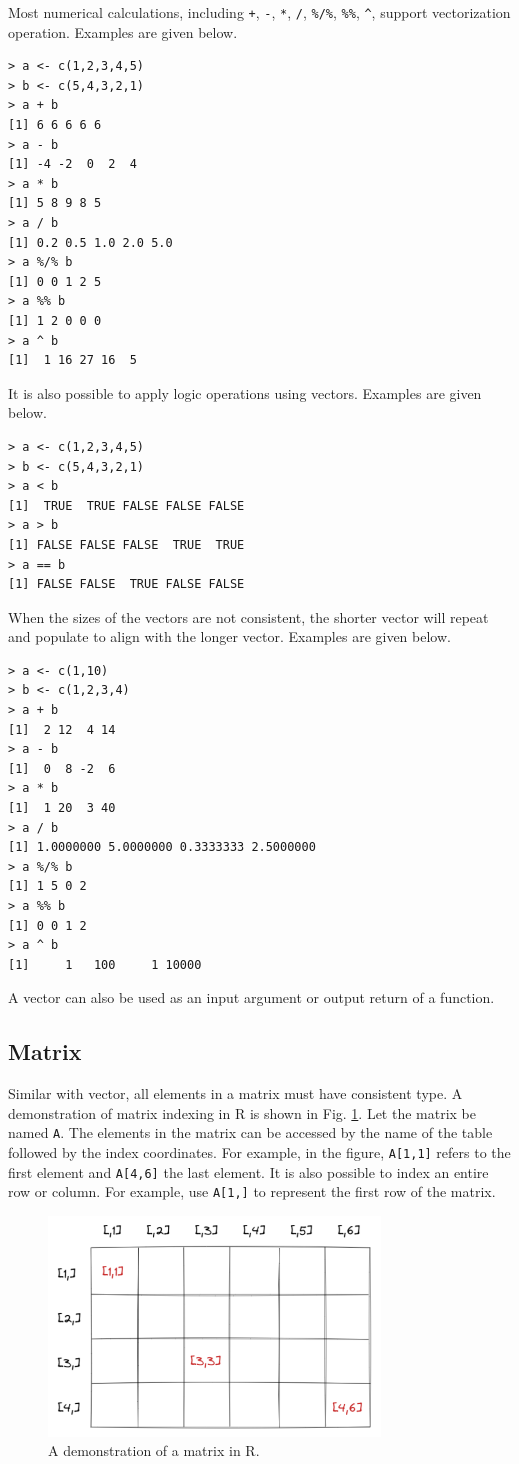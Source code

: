 Most numerical calculations, including \verb|+|, \verb|-|, \verb|*|, \verb|/|, \verb|%/%|, \verb|%%|, \verb|^|, support vectorization operation. Examples are given below.
\begin{lstlisting}
> a <- c(1,2,3,4,5)
> b <- c(5,4,3,2,1)
> a + b
[1] 6 6 6 6 6
> a - b
[1] -4 -2  0  2  4
> a * b
[1] 5 8 9 8 5
> a / b
[1] 0.2 0.5 1.0 2.0 5.0
> a %/% b
[1] 0 0 1 2 5
> a %% b
[1] 1 2 0 0 0
> a ^ b
[1]  1 16 27 16  5
\end{lstlisting}
It is also possible to apply logic operations using vectors. Examples are given below.
\begin{lstlisting}
> a <- c(1,2,3,4,5)
> b <- c(5,4,3,2,1)
> a < b
[1]  TRUE  TRUE FALSE FALSE FALSE
> a > b
[1] FALSE FALSE FALSE  TRUE  TRUE
> a == b
[1] FALSE FALSE  TRUE FALSE FALSE
\end{lstlisting}
When the sizes of the vectors are not consistent, the shorter vector will repeat and populate to align with the longer vector. Examples are given below.
\begin{lstlisting}
> a <- c(1,10)
> b <- c(1,2,3,4)
> a + b
[1]  2 12  4 14
> a - b
[1]  0  8 -2  6
> a * b
[1]  1 20  3 40
> a / b
[1] 1.0000000 5.0000000 0.3333333 2.5000000
> a %/% b
[1] 1 5 0 2
> a %% b
[1] 0 0 1 2
> a ^ b
[1]     1   100     1 10000
\end{lstlisting}

A vector can also be used as an input argument or output return of a function.

\subsection{Matrix}

Similar with vector, all elements in a matrix must have consistent type. A demonstration of matrix indexing in R is shown in Fig. \ref{ch:r1:fig:r_table_demo}. Let the matrix be named \verb|A|. The elements in the matrix can be accessed by the name of the table followed by the index coordinates. For example, in the figure, \verb|A[1,1]| refers to the first element and \verb|A[4,6]| the last element. It is also possible to index an entire row or column. For example, use \verb|A[1,]| to represent the first row of the matrix.

\begin{figure}
	\centering
	\includegraphics[width=250pt]{chapters/ch-r/figures/r_table_demo.png}
	\caption{A demonstration of a matrix in R.} \label{ch:r1:fig:r_table_demo}
\end{figure}

